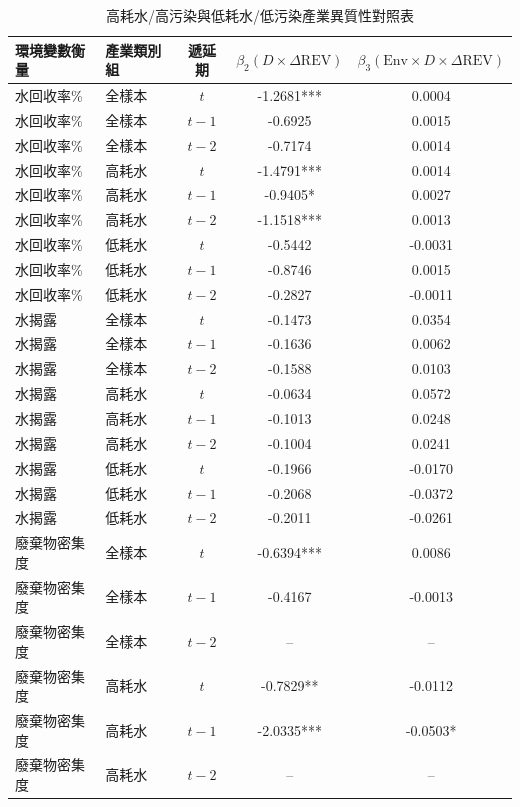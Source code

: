 \documentclass[12pt,a4paper]{article}
\begin{document}
\begin{table}[H]
\centering
\caption{高耗水/高污染與低耗水/低污染產業異質性對照表}
\label{tab:hetero_reg}
\begin{threeparttable}
\small
\begin{tabular}{llccc}
\toprule
環境變數衡量 & 產業類別組 & 遞延期 & $\beta_2 (D \times \Delta\text{REV})$ & $\beta_3 (\text{Env} \times D \times \Delta\text{REV})$ \\
\midrule
水回收率\% & 全樣本 & $t$ & -1.2681*** & 0.0004 \\
水回收率\% & 全樣本 & $t-1$ & -0.6925 & 0.0015 \\
水回收率\% & 全樣本 & $t-2$ & -0.7174 & 0.0014 \\
水回收率\% & 高耗水 & $t$ & -1.4791*** & 0.0014 \\
水回收率\% & 高耗水 & $t-1$ & -0.9405* & 0.0027 \\
水回收率\% & 高耗水 & $t-2$ & -1.1518*** & 0.0013 \\
水回收率\% & 低耗水 & $t$ & -0.5442 & -0.0031 \\
水回收率\% & 低耗水 & $t-1$ & -0.8746 & 0.0015 \\
水回收率\% & 低耗水 & $t-2$ & -0.2827 & -0.0011 \\
水揭露 & 全樣本 & $t$ & -0.1473 & 0.0354 \\
水揭露 & 全樣本 & $t-1$ & -0.1636 & 0.0062 \\
水揭露 & 全樣本 & $t-2$ & -0.1588 & 0.0103 \\
水揭露 & 高耗水 & $t$ & -0.0634 & 0.0572 \\
水揭露 & 高耗水 & $t-1$ & -0.1013 & 0.0248 \\
水揭露 & 高耗水 & $t-2$ & -0.1004 & 0.0241 \\
水揭露 & 低耗水 & $t$ & -0.1966 & -0.0170 \\
水揭露 & 低耗水 & $t-1$ & -0.2068 & -0.0372 \\
水揭露 & 低耗水 & $t-2$ & -0.2011 & -0.0261 \\
廢棄物密集度 & 全樣本 & $t$ & -0.6394*** & 0.0086 \\
廢棄物密集度 & 全樣本 & $t-1$ & -0.4167 & -0.0013 \\
廢棄物密集度 & 全樣本 & $t-2$ & -- & -- \\
廢棄物密集度 & 高耗水 & $t$ & -0.7829** & -0.0112 \\
廢棄物密集度 & 高耗水 & $t-1$ & -2.0335*** & -0.0503* \\
廢棄物密集度 & 高耗水 & $t-2$ & -- & -- \\

\end{tabular}
\end{threeparttable}
\end{table}
\end{document}
